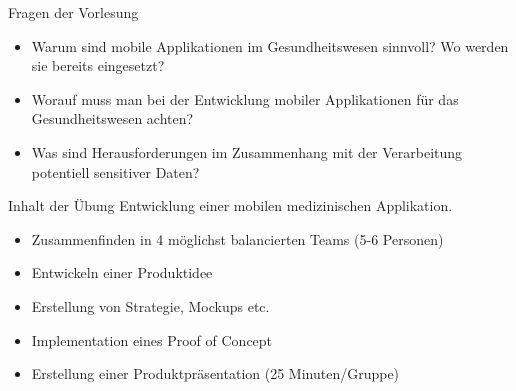\begin{frame}{Fragen der Vorlesung}
    \begin{itemize}
        \item Warum sind mobile Applikationen im Gesundheitswesen sinnvoll? Wo werden sie bereits eingesetzt?
        \item<2-> Worauf muss man bei der Entwicklung mobiler Applikationen für das Gesundheitswesen achten?
        \item<3-> Was sind Herausforderungen im Zusammenhang mit der Verarbeitung potentiell sensitiver Daten?
    \end{itemize} 
\end{frame}

\begin{frame}{Inhalt der Übung}
    Entwicklung einer mobilen medizinischen Applikation.
    \begin{itemize}
        \item<2-> Zusammenfinden in 4 möglichst balancierten Teams (5-6 Personen)
        \item<3-> Entwickeln einer Produktidee
        \item<4-> Erstellung von Strategie, Mockups etc.
        \item<5-> Implementation eines Proof of Concept
        \item<6-> Erstellung einer Produktpräsentation (25 Minuten/Gruppe)
    \end{itemize}
\end{frame}

